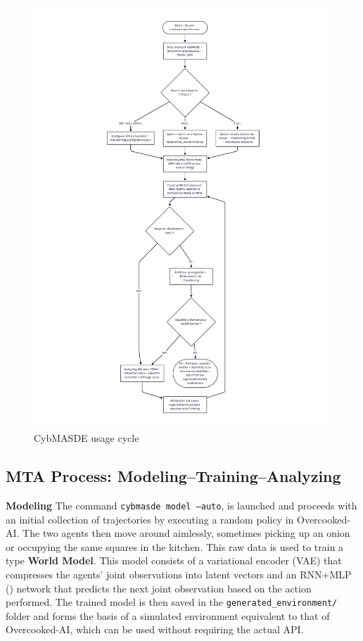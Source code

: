 \begin{figure}[H]
  \centering
  \includegraphics[trim={5cm 1cm 5cm 1cm},clip,height=\textheight]{figures/CybMASDE_user_flowchart.pdf}
  \caption{CybMASDE usage cycle}
  \label{fig:cybmasde_cycle}
\end{figure}

\subsection{MTA Process: Modeling–Training–Analyzing}

\noindent
\textbf{Modeling} \quad
The command \texttt{cybmasde model --auto},  is launched and proceeds with an initial collection of trajectories by executing a random policy in Overcooked-AI. The two agents then move around aimlessly, sometimes picking up an onion or occupying the same squares in the kitchen. This raw data is used to train a  type \textbf{World Model}. This model consists of a variational encoder (VAE) that compresses the agents' joint observations into latent vectors and an RNN+MLP () network that predicts the next joint observation based on the action performed. The trained model is then saved in the \texttt{generated\_environment/} folder and forms the basis of a simulated environment equivalent to that of Overcooked-AI, which can be used without requiring the actual API.

